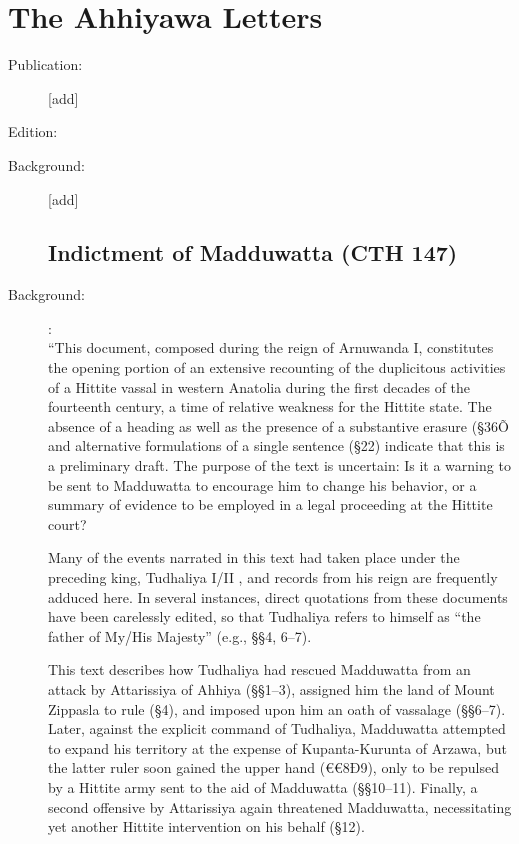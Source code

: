 \documentclass[10pt]{article}
\renewcommand{\.}[1]{\textsubdot{#1}}
\begin{document}
\section{The Ahhiyawa Letters}


\begin{description}

\item[Publication:] [add]
\item[Edition:] \citet{beckman2011ahhiyawa}
\item[Background:] [add] \\

\subsection{Indictment of Madduwatta (CTH 147)}

\item[Background:] \citet[69-70]{beckman2011ahhiyawa}: \\ 
``This document, composed during the reign of Arnuwanda I, constitutes the opening portion of an extensive recounting of the duplicitous activities of a Hittite vassal in western Anatolia during the first decades of the fourteenth century, a time of relative weakness for the Hittite state. The absence of a heading as well as the presence of a substantive erasure (\S36Õ and alternative formulations of a single sentence (\S22) indicate that this is a preliminary draft. The purpose of the text is uncertain: Is it a warning to be sent to Madduwatta to encourage him to change his behavior, or a summary of evidence to be employed in a legal proceeding at the Hittite court?

Many of the events narrated in this text had taken place under the preceding king, Tudhaliya I/II , and records from his reign are frequently adduced here. In several instances, direct quotations from these documents have been carelessly edited, so that Tudhaliya refers to himself as ``the father of My/His Majesty'' (e.g., \S\S4, 6--7).

This text describes how Tudhaliya had rescued Madduwatta from an attack by Attarissiya of Ahhiya (\S\S1--3), assigned him the land of Mount Zippasla to rule (\S4), and imposed upon him an oath of vassalage (\S\S6--7). Later, against the explicit command of Tudhaliya, Madduwatta attempted to expand his territory at the expense of Kupanta-Kurunta of Arzawa, but the latter ruler soon gained the upper hand (€€8Ð9), only to be repulsed by a Hittite army sent to the aid of Madduwatta (\S\S10--11). Finally, a second offensive by Attarissiya again threatened Madduwatta, necessitating yet another Hittite intervention on his behalf (\S12).


\end{description}
\end{document}
